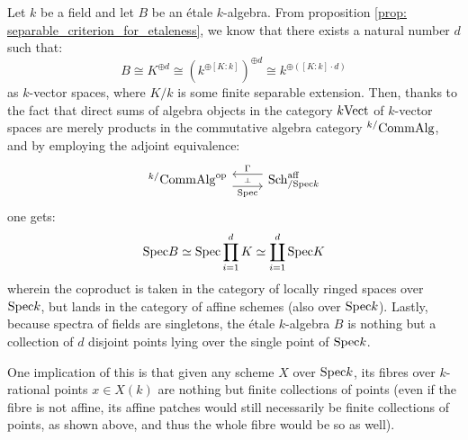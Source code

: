             \begin{remark} \label{remark: fibres_of_etale_maps_over_points}
                Let $k$ be a field and let $B$ be an \'etale $k$-algebra. From proposition \ref{prop: separable_criterion_for_etaleness}, we know that there exists a natural number $d$ such that:
                    $$B \cong K^{\oplus d} \cong (k^{\oplus [K : k]})^{\oplus d} \cong k^{\oplus ([K : k] \cdot d)}$$
                as $k$-vector spaces, where $K/k$ is some finite separable extension. Then, thanks to the fact that direct sums of algebra objects in the category $k\mathrm{Vect}$ of $k$-vector spaces are merely products in the commutative algebra category ${}^{k/}\mathrm{Comm}\mathrm{Alg}$, and by employing the adjoint equivalence:
                    $$
                        \begin{tikzcd}
                        	{{}^{k/}\Comm\Alg^{\op}} & {\Sch^{\aff}_{/\Spec k}}
                        	\arrow[""{name=0, anchor=center, inner sep=0}, "\Spec"', shift right=2, from=1-1, to=1-2]
                        	\arrow[""{name=1, anchor=center, inner sep=0}, "\Gamma"', shift right=2, from=1-2, to=1-1]
                        	\arrow["\dashv"{anchor=center, rotate=-90}, draw=none, from=1, to=0]
                        \end{tikzcd}
                    $$
                one gets:
                    $$\mathrm{Spec} B \simeq \mathrm{Spec} \prod_{i = 1}^d K \simeq \coprod_{i = 1}^d \mathrm{Spec} K$$
                wherein the coproduct is taken in the category of locally ringed spaces over $\mathrm{Spec} k$, but lands in the category of affine schemes (also over $\mathrm{Spec} k$). Lastly, because spectra of fields are singletons, the \'etale $k$-algebra $B$ is nothing but a collection of $d$ disjoint points lying over the single point of $\mathrm{Spec} k$. 
                
                One implication of this is that given any scheme $X$ over $\mathrm{Spec} k$, its fibres over $k$-rational points $x \in X(k)$ are nothing but finite collections of points (even if the fibre is not affine, its affine patches would still necessarily be finite collections of points, as shown above, and thus the whole fibre would be so as well).
            \end{remark}
            
